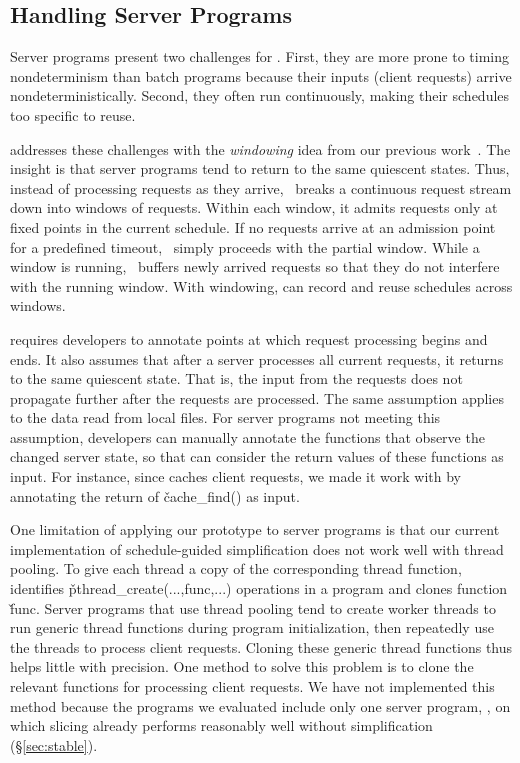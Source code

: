 \subsection{Handling Server Programs} \label{sec:window}

Server programs present two challenges for \peregrine.  First, they are more
prone to timing nondeterminism than batch programs because their inputs
(client requests) arrive nondeterministically.  Second, they often run
continuously, making their schedules too specific to reuse.  

\peregrine addresses these challenges with the \emph{windowing} idea from our
previous work~\cite{cui:tern:osdi10}.  The insight is that server programs
tend to return to the same quiescent states.  Thus, instead of processing
requests as they arrive, \peregrine\ breaks a continuous request stream down into
windows of requests.  Within each window, it admits requests only at fixed
points in the current schedule.  If no requests arrive at an admission
point for a predefined timeout, \peregrine\ simply proceeds with the partial
window.  While a window is running, \peregrine\ buffers newly arrived requests
so that they do not interfere with the running window.  With windowing,
\peregrine can record and reuse schedules across windows.

\peregrine requires developers to annotate points at which request processing begins and
ends.  It also assumes that after a server processes all current requests,
it returns to the same quiescent state.  That is, the input from
the requests does not propagate further after the requests are processed.
The same assumption applies to the data read from local files.
For server programs not meeting this assumption, developers can manually
annotate the functions that observe the changed server state, so that \peregrine
can consider the return values of these functions as input.
For instance, since \apache caches client requests, we made it work with \peregrine
by annotating the return of \v{cache\_find()} as input.

One limitation of applying our \peregrine prototype to server programs is that our current
implementation of schedule-guided simplification does not work well with
thread pooling.  To give each thread a copy of the corresponding thread
function, \peregrine identifies \v{pthread\_create(...,func,...)} operations in
a program and clones function \v{func}.  Server programs that use
thread pooling tend to create worker threads to run generic thread
functions during program initialization, then repeatedly use the threads
to process client requests.  Cloning these generic thread functions thus
helps little with precision.  One method to solve this problem is to clone
the relevant functions for processing client requests.  We have not
implemented this method because the programs we evaluated include only one server
program, \apache, on which slicing already performs reasonably well
without simplification (\S\ref{sec:stable}).


